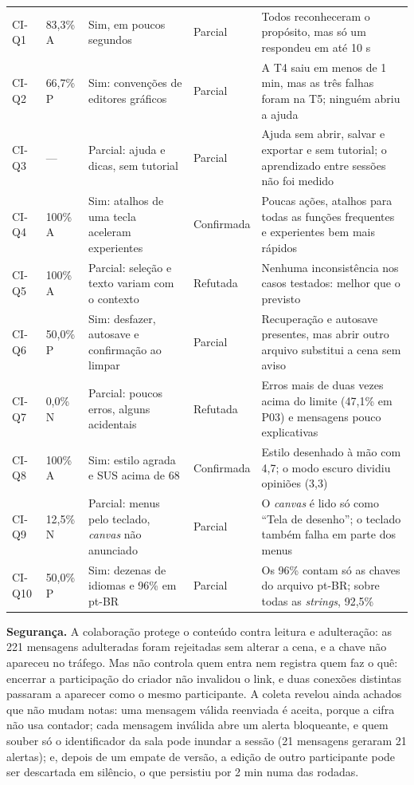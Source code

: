 \documentclass[conference]{IEEEtran}
\begin{document}
\begin{table}[!t]
\begin{tabular}{@{}L{0.95cm} L{1.15cm} L{4.9cm} L{1.5cm} L{7.9cm}@{}}
\midrule
CI-Q1 & 83,3\% A & Sim, em poucos segundos & Parcial & Todos reconheceram o propósito, mas só um respondeu em até 10 s\\
CI-Q2 & 66,7\% P & Sim: convenções de editores gráficos & Parcial & A T4 saiu em menos de 1 min, mas as três falhas foram na T5; ninguém abriu a ajuda\\
CI-Q3 & --- & Parcial: ajuda e dicas, sem tutorial & Parcial & Ajuda sem abrir, salvar e exportar e sem tutorial; o aprendizado entre sessões não foi medido\\
CI-Q4 & 100\% A & Sim: atalhos de uma tecla aceleram experientes & Confirmada & Poucas ações, atalhos para todas as funções frequentes e experientes bem mais rápidos\\
CI-Q5 & 100\% A & Parcial: seleção e texto variam com o contexto & Refutada & Nenhuma inconsistência nos casos testados: melhor que o previsto\\
CI-Q6 & 50,0\% P & Sim: desfazer, autosave e confirmação ao limpar & Parcial & Recuperação e autosave presentes, mas abrir outro arquivo substitui a cena sem aviso\\
CI-Q7 & 0,0\% N & Parcial: poucos erros, alguns acidentais & Refutada & Erros mais de duas vezes acima do limite (47,1\% em P03) e mensagens pouco explicativas\\
CI-Q8 & 100\% A & Sim: estilo agrada e SUS acima de 68 & Confirmada & Estilo desenhado à mão com 4,7; o modo escuro dividiu opiniões (3,3)\\
CI-Q9 & 12,5\% N & Parcial: menus pelo teclado, \textit{canvas} não anunciado & Parcial & O \textit{canvas} é lido só como ``Tela de desenho''; o teclado também falha em parte dos menus\\
CI-Q10 & 50,0\% P & Sim: dezenas de idiomas e 96\% em pt-BR & Parcial & Os 96\% contam só as chaves do arquivo pt-BR; sobre todas as \textit{strings}, 92,5\%\\
\bottomrule
\end{tabular}
\end{table}

\textbf{Segurança.} A colaboração protege o conteúdo contra leitura e
adulteração: as 221 mensagens adulteradas foram rejeitadas sem alterar a
cena, e a chave não apareceu no tráfego. Mas não controla quem entra nem
registra quem faz o quê: encerrar a participação do criador não invalidou o
link, e duas conexões distintas passaram a aparecer como o mesmo
participante. A coleta revelou ainda achados que não mudam notas: uma
mensagem válida reenviada é aceita, porque a cifra não usa contador; cada
mensagem inválida abre um alerta bloqueante, e quem souber só o
identificador da sala pode inundar a sessão (21 mensagens geraram 21
alertas); e, depois de um empate de versão, a edição de outro participante
pode ser descartada em silêncio, o que persistiu por 2 min numa das rodadas.
\end{document}
